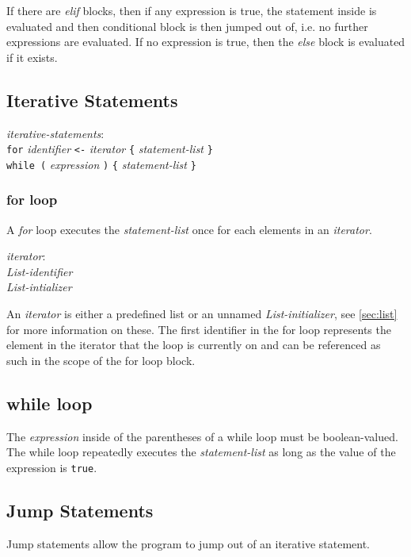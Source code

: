 \documentclass{article}
\begin{document}
If there are \emph{elif} blocks, then if any expression is true, the statement inside is evaluated and then conditional block is then jumped out of, i.e. no further expressions are evaluated. If no expression is true, then the \emph{else} block is evaluated if it exists.

\subsection{Iterative Statements}

\begin{tabbing}
	\= \emph{iter}\=\emph{ative-statements}: \\
	\> \> \texttt{for} \emph{identifier} \texttt{<-} \emph{iterator} \texttt{\{} \emph{statement-list} \texttt{\}} \\
	\> \> \texttt{while (} \emph{expression} \texttt{)} \texttt{\{} \emph{statement-list} \texttt{\}}
\end{tabbing}

\subsubsection{for loop}

A \emph{for} loop executes the \emph{statement-list} once for each elements in an \emph{iterator}.

\begin{tabbing}
\= \emph{iter}\=\emph{ator}:\\
\>\> \emph{List-identifier} \\
\>\> \emph{List-intializer}
\end{tabbing}

An \emph{iterator} is either a predefined list or an unnamed \emph{List-initializer}, see \ref{sec:list} for more information on these. The first identifier in the for loop represents the element in the iterator that the loop is currently on and can be referenced as such in the scope of the for loop block.

\subsection{while loop}

The \emph{expression} inside of the parentheses of a while loop must be boolean-valued. The while loop repeatedly executes the \emph{statement-list} as long as the value of the expression is \texttt{true}.

\subsection{Jump Statements}
Jump statements allow the program to jump out of an iterative statement.
\end{document}
